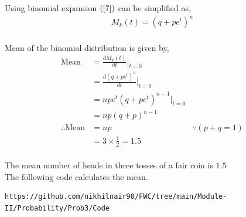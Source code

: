 \documentclass[journal,12pt,twocolumn]{IEEEtran}
\begin{document}
Using binomial expansion $(\ref{7})$ can be simplified as,
\begin{align}
M_k(t)= (q + pe^t)^n
\end{align}
\\

Mean of the binomial distribution is given by,
\begin{align}
\text{Mean}&= \frac{dM_k(t)}{dt}|_{t=0}&
\\
&= \frac{d(q + pe^t)^n}{dt}|_{t=0}&
\\
&=npe^t(q + pe^t)^{n-1}|_{t=0}&
\\
&= np(q + p)^{n-1}&
\\
\therefore \text{Mean} &= np& {}\because(p+q=1)
\\
&= 3\times\frac{1}{2}= 1.5&
\end{align}
\\

The mean number of heads in three tosses of a fair coin is $1.5$
\\

The following code calculates the mean.
\begin{lstlisting}
https://github.com/nikhilnair90/FWC/tree/main/Module-II/Probability/Prob3/Code
\end{lstlisting}
\end{document}
